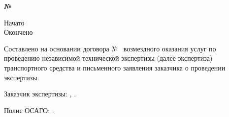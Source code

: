 \noindent \textbf{№ \NomerDoc}\hfill           \textbf{}\\%

\noindent\parbox[l][16mm]{16.5cm}
{\def\hrf#1{\hbox to#1{\hrulefill}}
	\noindent Начато\hfill            \datastart\\%
	Окончено\hfill                {}
}
\relax

%
%
%
\vspace{4mm}
Составлено на основании	договора № \NomerDoc\,  возмездного оказания услуг по проведению независимой технической экспертизы (далее экспертиза)  транспортного средства и письменного заявления заказчика о проведении экспертизы.

Заказчик  экспертизы: , . 

Полис ОСАГО: \polis.



